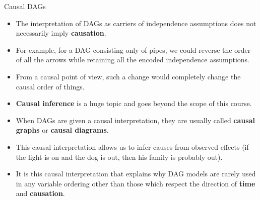 \documentclass[handout]{beamer}
\begin{document}
\begin{frame}{Causal DAGs}
\scriptsize{
\begin{itemize}


\item The interpretation of DAGs as carriers of independence assumptions does not necessarily imply \textbf{causation}.

\item For example, for a DAG consisting only of pipes, we could reverse the order of all the arrows while retaining all the encoded independence assumptions.

\item From a causal point of view, such a change would completely change the causal order of things.

\item \textbf{Causal inference} is a huge topic and goes beyond the scope of this course.

\item When DAGs are given a causal interpretation, they are usually called \textbf{causal graphs} or \textbf{causal diagrams}.


\item This causal interpretation allows us to infer causes from observed effects (if the light is on and the dog is out, then his family is probably out).

\item It is this causal interpretation that explains why DAG models are rarely used in any variable ordering other than those which respect the direction of \textbf{time} and \textbf{causation}. \cite{pearl2009causality}

\end{itemize}



} 

\end{frame}
\end{document}
